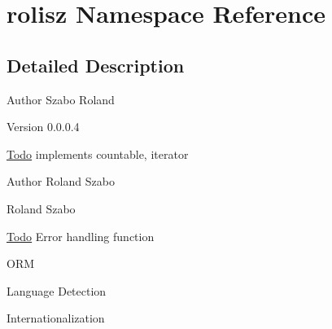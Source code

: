 \hypertarget{namespacerolisz}{
\section{rolisz Namespace Reference}
\label{namespacerolisz}
}


\subsection{Detailed Description}
\begin{DoxyAuthor}{Author}
Szabo Roland 
\end{DoxyAuthor}
\begin{DoxyVersion}{Version}
0.0.0.4 
\end{DoxyVersion}
\begin{Desc}
\item[\hyperlink{todo__todo000001}{Todo}]implements countable, iterator \end{Desc}


\begin{DoxyAuthor}{Author}
Roland Szabo

Roland Szabo 
\end{DoxyAuthor}
\begin{Desc}
\item[\hyperlink{todo__todo000005}{Todo}]Error handling function 

ORM 

Language Detection 

Internationalization \end{Desc}
